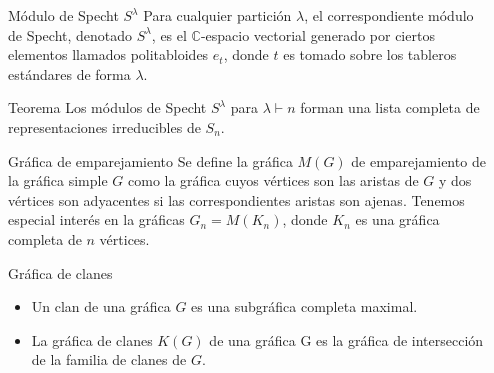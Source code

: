 \documentclass[final,xcolor=svgnames]{beamer}
\begin{document}
\begin{frame}{}
\begin{columns}
\begin{column}{0.5\textwidth}
      \begin{block}{Módulo de Specht $S^{\lambda}$}
        Para cualquier partición $\lambda$, el correspondiente
        \alert{módulo de Specht}, denotado $S^{\lambda}$, es el
        $\mathbb{C}$-espacio vectorial generado por ciertos elementos llamados
        politabloides $e_{t}$, donde $t$ es tomado sobre los
        tableros estándares de forma
        $\lambda$.

      \end{block} 

       \begin{block}{Teorema}
         Los módulos de Specht $S^{\lambda}$ para $\lambda\vdash n$
         forman una lista completa de representaciones irreducibles de
         $S_{n}$.
     \end{block}

     \begin{block}{Gráfica de emparejamiento}
       Se define la \alert{gráfica $M(G)$ de emparejamiento} de la gráfica
       simple $G$ como la gráfica cuyos vértices son las aristas de
       $G$ y dos vértices son adyacentes si las correspondientes
       aristas son ajenas. Tenemos especial interés en la gráficas
       $G_{n}=M(K_{n})$, donde $K_{n}$ es una gráfica completa de $n$ vértices.
     \end{block}
     
     \begin{block}{Gráfica de clanes}
       \begin{itemize}
       \item Un \alert{clan} de una gráfica $G$ es una subgráfica completa maximal. 
       \item La \alert{gráfica de clanes $K(G)$} de una gráfica G es la gráfica de intersección de
         la familia de clanes de $G$.   
       \end{itemize}
     \end{block}
      
    \end{column}

    \begin{column}{0.5\textwidth}
      

\end{column}
\end{columns}
\end{frame}
\end{document}

